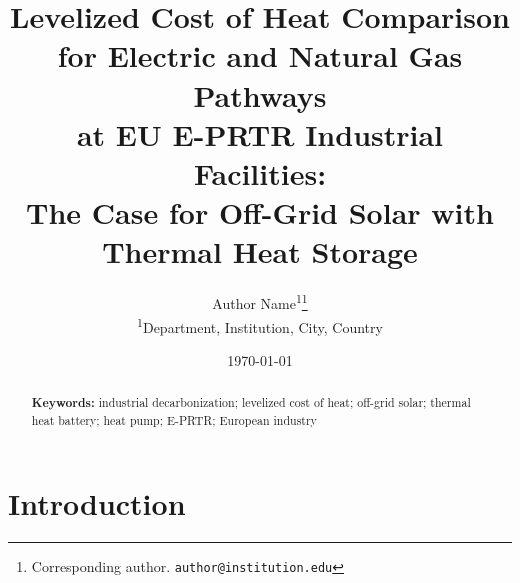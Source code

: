 \documentclass[12pt, a4paper]{article}
\title{Levelized Cost of Heat Comparison for Electric and Natural Gas Pathways\\
       at EU E-PRTR Industrial Facilities:\\
       The Case for Off-Grid Solar with Thermal Heat Storage}
\author{
  Author Name\textsuperscript{1}\thanks{Corresponding author. \texttt{author@institution.edu}} \\
  \textsuperscript{1}Department, Institution, City, Country
}
\date{\today}
\begin{document}
\maketitle

\begin{abstract}

\noindent\textbf{Keywords:} industrial decarbonization; levelized cost of heat; off-grid solar; thermal heat battery; heat pump; E-PRTR; European industry
\end{abstract}

\section{Introduction}
\label{sec:intro}

%
%
%
%
%
\end{document}
